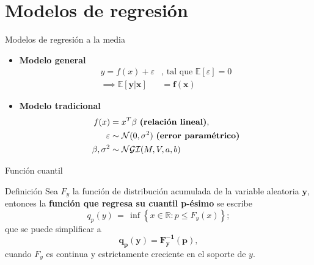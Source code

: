 \documentclass{beamer}
\begin{document}
\section{Modelos de regresi\'on}

\begin{frame}{Modelos de regresi\'on a la media}{}
  \begin{itemize}
  \setlength\itemsep{2em}
      \item {
      \textbf{Modelo general}
      \begin{equation*}
      \begin{aligned}
          y = f(x) + \varepsilon
          &\text{, tal que }\mathbb{E}[\varepsilon] = 0\\
          \implies \bm{\mathbb{E}[y|x]} &= \bm{f(x)}
      \end{aligned}
      \end{equation*}
      }
      \item{
      \textbf{Modelo tradicional}
      \begin{equation*}
      \begin{aligned}
        f(x) &= x^T\beta \text{ \textbf{(relaci\'on lineal)}},\\
        \varepsilon &\sim \mathcal{N}(0,\sigma^2) \text{ \textbf{(error param\'etrico)}} \\
        \beta,\sigma^2 &\sim \mathcal{NGI}(M,V,a,b)
      \end{aligned}
      \end{equation*}
      }
  \end{itemize}
\end{frame}

\begin{frame}{Funci\'on cuantil}
\begin{block}{Definici\'on}
    Sea $F_y$ la funci\'on de distribuci\'on acumulada de la variable aleatoria $\bm{y}$, entonces la \textbf{funci\'on que regresa su cuantil p-\'esimo} se escribe
    \begin{equation*}
        q_p(y)\,=\,\inf \left\{x\in {\mathbb  {R}}:p\leq F_y(x)\right\};
    \end{equation*}
    que se puede simplificar a
    \begin{equation*}
        \mathbf{q_p(y)=F_y^{-1}(p)},
    \end{equation*}
    cuando $F_y$ es continua y estrictamente creciente en el soporte de $y$.
\end{block}
\end{frame}
\end{document}
